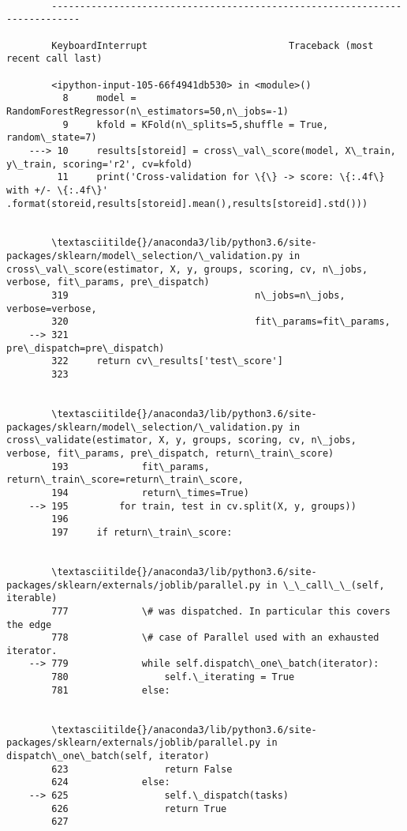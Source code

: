\documentclass[11pt]{article}
\begin{document}
    \begin{Verbatim}[commandchars=\\\{\}]

        ---------------------------------------------------------------------------

        KeyboardInterrupt                         Traceback (most recent call last)

        <ipython-input-105-66f4941db530> in <module>()
          8     model = RandomForestRegressor(n\_estimators=50,n\_jobs=-1)
          9     kfold = KFold(n\_splits=5,shuffle = True, random\_state=7)
    ---> 10     results[storeid] = cross\_val\_score(model, X\_train, y\_train, scoring='r2', cv=kfold)
         11     print('Cross-validation for \{\} -> score: \{:.4f\} with +/- \{:.4f\}'          .format(storeid,results[storeid].mean(),results[storeid].std()))


        \textasciitilde{}/anaconda3/lib/python3.6/site-packages/sklearn/model\_selection/\_validation.py in cross\_val\_score(estimator, X, y, groups, scoring, cv, n\_jobs, verbose, fit\_params, pre\_dispatch)
        319                                 n\_jobs=n\_jobs, verbose=verbose,
        320                                 fit\_params=fit\_params,
    --> 321                                 pre\_dispatch=pre\_dispatch)
        322     return cv\_results['test\_score']
        323 


        \textasciitilde{}/anaconda3/lib/python3.6/site-packages/sklearn/model\_selection/\_validation.py in cross\_validate(estimator, X, y, groups, scoring, cv, n\_jobs, verbose, fit\_params, pre\_dispatch, return\_train\_score)
        193             fit\_params, return\_train\_score=return\_train\_score,
        194             return\_times=True)
    --> 195         for train, test in cv.split(X, y, groups))
        196 
        197     if return\_train\_score:


        \textasciitilde{}/anaconda3/lib/python3.6/site-packages/sklearn/externals/joblib/parallel.py in \_\_call\_\_(self, iterable)
        777             \# was dispatched. In particular this covers the edge
        778             \# case of Parallel used with an exhausted iterator.
    --> 779             while self.dispatch\_one\_batch(iterator):
        780                 self.\_iterating = True
        781             else:


        \textasciitilde{}/anaconda3/lib/python3.6/site-packages/sklearn/externals/joblib/parallel.py in dispatch\_one\_batch(self, iterator)
        623                 return False
        624             else:
    --> 625                 self.\_dispatch(tasks)
        626                 return True
        627 



\end{Verbatim}
\end{document}

